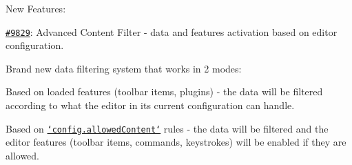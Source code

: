 New Features\-:
\begin{DoxyItemize}
\item \href{http://dev.ckeditor.com/ticket/9829}{\tt \#9829}\-: Advanced Content Filter -\/ data and features activation based on editor configuration.

Brand new data filtering system that works in 2 modes\-:
\begin{DoxyItemize}
\item Based on loaded features (toolbar items, plugins) -\/ the data will be filtered according to what the editor in its current configuration can handle.
\item Based on \href{http://docs.ckeditor.com/#!/api/CKEDITOR.config-cfg-allowedContent}{\tt `config.allowed\-Content`} rules -\/ the data will be filtered and the editor features (toolbar items, commands, keystrokes) will be enabled if they are allowed.
\end{DoxyItemize}


\end{DoxyItemize}
